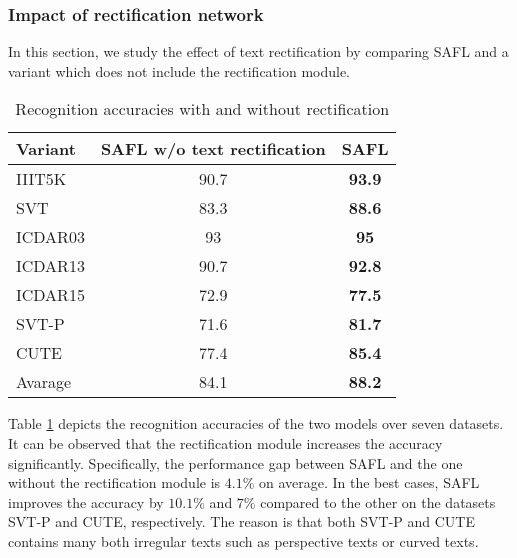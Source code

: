 \subsubsection{Impact of rectification network}
In this section, we study the effect of text rectification by comparing SAFL and a variant which does not include the rectification module. 
\begin{table}[h]
\centering
\caption{Recognition accuracies with and without rectification}
\label{tab:withoutrec}
\begin{tabular}{|l|cc|}
\hline
\textbf{Variant} & \textbf{SAFL w/o text rectification} & \textbf{SAFL} \\ \hline
IIIT5K  & 90.7   & \textbf{93.9}\\
SVT  & 83.3    & \textbf{88.6}\\
ICDAR03 & 93     & \textbf{95}\\
ICDAR13 & 90.7& \textbf{92.8}\\
ICDAR15 & 72.9     & \textbf{77.5}\\
SVT-P& 71.6    & \textbf{81.7}\\
CUTE & 77.4     & \textbf{85.4}\\ \hline
Avarage & 84.1 & \textbf{88.2}\\ \hline

\end{tabular}
\end{table}

Table \ref{tab:withoutrec} depicts the recognition accuracies of the two models over seven datasets. It can be observed that the rectification module increases the accuracy significantly. Specifically, the performance gap between SAFL and the one without the rectification module is $4.1 \%$ on average. 
In the best cases, SAFL improves the accuracy by $10.1\%$ and $7\%$ compared to the other on the datasets SVT-P and CUTE, respectively.
The reason is that both SVT-P and CUTE contains many both irregular texts such as perspective texts or curved texts. 

